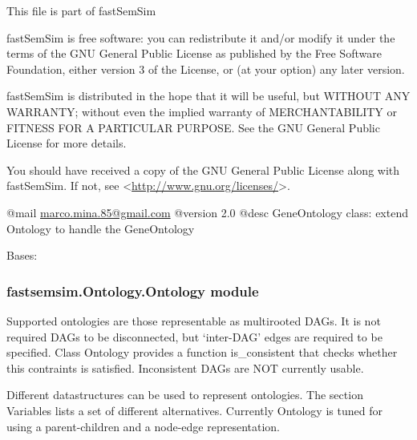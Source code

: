 \documentclass[letterpaper,10pt,english]{sphinxmanual}
\begin{document}
This file is part of fastSemSim

fastSemSim is free software: you can redistribute it and/or modify
it under the terms of the GNU General Public License as published by
the Free Software Foundation, either version 3 of the License, or
(at your option) any later version.

fastSemSim is distributed in the hope that it will be useful,
but WITHOUT ANY WARRANTY; without even the implied warranty of
MERCHANTABILITY or FITNESS FOR A PARTICULAR PURPOSE.  See the
GNU General Public License for more details.

You should have received a copy of the GNU General Public License
along with fastSemSim.  If not, see \textless{}\href{http://www.gnu.org/licenses/}{http://www.gnu.org/licenses/}\textgreater{}.

@mail \href{mailto:marco.mina.85@gmail.com}{marco.mina.85@gmail.com}
@version 2.0
@desc GeneOntology class: extend Ontology to handle the GeneOntology

\begin{fulllineitems}
\label{fastsemsim.Ontology:fastsemsim.Ontology.GeneOntology.GeneOntology}
Bases: {\hyperref[fastsemsim.Ontology:fastsemsim.Ontology.Ontology.Ontology]{}}

\end{fulllineitems}



\subsubsection{fastsemsim.Ontology.Ontology module}
\label{fastsemsim.Ontology:module-fastsemsim.Ontology.Ontology}\label{fastsemsim.Ontology:fastsemsim-ontology-ontology-module}
Supported ontologies are those representable as multirooted DAGs. It is not required DAGs to be disconnected, but `inter-DAG' edges are required to be specified. Class Ontology provides a function is\_consistent that checks whether this contraints is satisfied. Inconsistent DAGs are NOT currently usable.

Different datastructures can be used to represent ontologies. The section Variables lists a set of different alternatives. Currently Ontology is tuned for using a parent-children and a node-edge representation.
\end{document}
